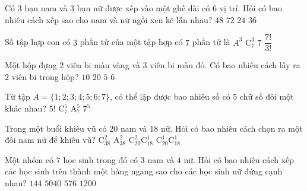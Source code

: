 \begin{ex}%
Có $3$ bạn nam và $3$ bạn nữ được xếp vào một ghế dài có $6$ vị trí. Hỏi có bao nhiêu cách xếp sao cho nam và nữ ngồi xen kẽ lẫn nhau?
\choice
{$48$}
{\True $72$}
{$24$}
{$36$}
\end{ex}

\begin{ex}%
Số tập hợp con có $3$ phần tử của một tập hợp có $7$ phần tử là
\choice
{$A^{3}$}
{\True $\mathrm{C}_{7}^{3}$}
{$7$}
{$\dfrac{7!}{3!}$}
\end{ex}

\begin{ex}%
Một hộp đựng $2$ viên bi màu vàng và $3$ viên bi màu đỏ. Có bao nhiêu cách lấy ra $2$ viên bi trong hộp?
\choice
{\True $10$}
{$20$}
{$5$}
{$6$}
\end{ex}

\begin{ex}%
Từ tập $A=\{1; 2; 3; 4; 5; 6; 7\}$, có thể lập được bao nhiêu số có $5$ chữ số đôi một khác nhau?
\choice
{$5!$}
{$\mathrm{C}_{7}^{5}$}
{\True $\mathrm{A}_{7}^{5}$}
{$7^{5}$}
\end{ex}

\begin{ex}%
Trong một buổi khiêu vũ có $20$ nam và $18$ nữ. Hỏi có bao nhiêu cách chọn ra một đôi nam nữ để khiêu vũ?
\choice
{$\mathrm{C}_{38}^{2}$}
{$\mathrm{A}_{38}^{2}$}
{$\mathrm{C}_{20}^{2} \mathrm{C}_{18}^{1}$}
{\True $\mathrm{C}_{20}^{1} \mathrm{C}_{18}^{1}$}
\end{ex}

\begin{ex}%
Một nhóm có $7$ học sinh trong đó có $3$ nam và $4$ nữ. Hỏi có bao nhiêu cách xếp các học sinh trên thành một hàng ngang sao cho các học sinh nữ đứng cạnh nhau?
\choice
{$144$}
{$5040$}
{\True $576$}
{$1200$}
\end{ex}

